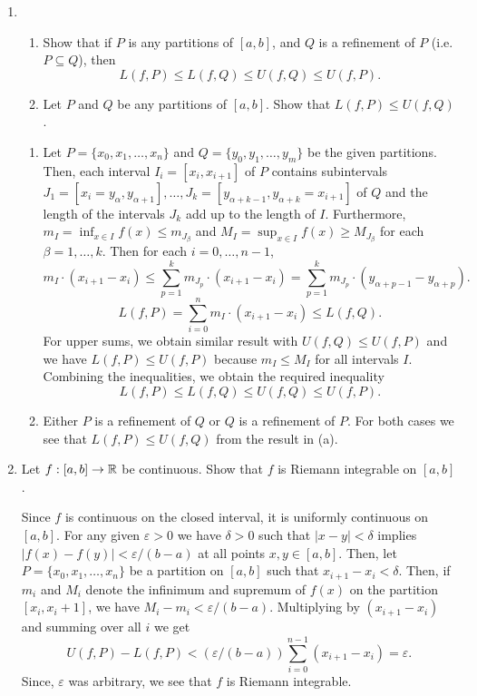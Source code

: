 \documentclass[12pt]{article}
\begin{document}
\begin{enumerate}

\item \begin{enumerate}
\item Show that if $P$ is any partitions of $[a,b]$, and
$Q$ is a refinement of $P$ (i.e. $P \subseteq Q$), then 
$$L(f,P) \leq L(f,Q) \leq U(f,Q) \leq U(f,P).$$
\item Let $P$ and $Q$ be any partitions of $[a,b]$.
Show that $L(f, P) \leq U(f, Q)$.
\end{enumerate}

\begin{mybox}

\begin{enumerate}
  \item Let $P=\{x_0,x_1,\ldots,x_n\}$ and $Q=\{y_0,y_1,\ldots,
  y_m\}$ be the given partitions. Then, each interval $I_i=
  [x_i,x_{i+1}]$ of $P$ contains subintervals $J_1
  =[x_i=y_\alpha,y_{\alpha+1}],\ldots,
  J_k=[y_{\alpha+k-1},y_{\alpha+k}=x_{i+1}]$ of $Q$ and the
  length of the intervals $J_k$ add up to the length of $I$.
  Furthermore,
  $m_I=\inf_{x\in I}
  {f(x)}\leq m_{J_\beta}$ and $M_I=\sup_{x\in I}
  {f(x)}\geq M_{J_\beta}$ for each $\beta=1,\ldots,
  k$. Then for each $i=0,\ldots,n-1$,
  $$m_I\cdot(x_{i+1}-x_i)\leq \sum_{p=1}^k{m_{J_p}\cdot(x_{i+1}
  -x_i)}=\sum_{p=1}^k{m_{J_p}\cdot(y_{\alpha+p-1}
  -y_{\alpha+p})}.$$
  $$L(f,P)=\sum_{i=0}^n{m_I\cdot(x_{i+1}-x_i)}\leq L(f,Q).$$
  For upper sums, we obtain similar result with
  $U(f,Q) \leq U(f,P)$ and we have $L(f,P) \leq U(f,P)$ because
  $m_I\leq M_I$ for all intervals $I$. Combining the inequalities,
  we obtain the required inequality
  $$L(f,P) \leq L(f,Q) \leq U(f,Q) \leq U(f,P).$$

  \item Either $P$ is a refinement of $Q$ or $Q$ is a refinement
  of $P$. For both cases we see that $L(f, P) \leq U(f, Q)$
  from the result in (a).
\end{enumerate}
\end{mybox}

 \item Let $f: [a,b] \to \mathbb{R}$ be continuous.
 Show that $f$ is Riemann integrable on $[a,b]$.

\begin{mybox}

Since $f$ is continuous on the closed interval, it is uniformly
continuous on $[a,b]$.
For any given $\varepsilon>0$ we have $\delta>0$ such that
$|x-y|<\delta$ implies $|f(x)-f(y)|<\varepsilon/(b-a)$
at all points $x,y\in [a,b]$. Then, let $P=\{x_0,x_1,
\ldots,x_n\}$ be a partition on $[a,b]$ such that $x_{i+1}
-x_i<\delta$. Then, if $m_i$ and $M_i$ denote the infinimum
and supremum of $f(x)$ on the partition $[x_i,x_i+1]$, we have
$M_i-m_i<\varepsilon/(b-a)$. Multiplying by $(x_{i+1}-x_i)$ and
summing over all $i$ we get
$$U(f,P)-L(f,P)<(\varepsilon/(b-a))\sum_{i=0}^{n-1}
{(x_{i+1}-x_i)}=\varepsilon.$$
Since, $\varepsilon$ was arbitrary, we see that $f$ is
Riemann integrable.


\end{mybox}
\end{enumerate}
\end{document}
